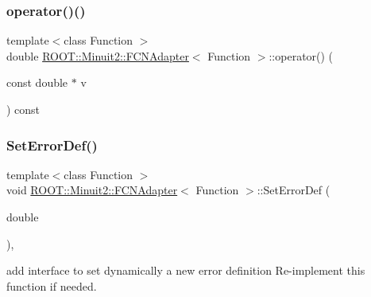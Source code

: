 \mbox{\label{classROOT_1_1Minuit2_1_1FCNAdapter_a9321402d626f4bdfbdbef3b63d452daf}} 
\subsubsection{\texorpdfstring{operator()()}{operator()()}\hspace{0.1cm}{\footnotesize\ttfamily [6/6]}}
{\footnotesize\ttfamily template$<$class Function $>$ \\
double \mbox{\hyperlink{classROOT_1_1Minuit2_1_1FCNAdapter}{R\+O\+O\+T\+::\+Minuit2\+::\+F\+C\+N\+Adapter}}$<$ Function $>$\+::operator() (\begin{DoxyParamCaption}\item[{const double $\ast$}]{v }\end{DoxyParamCaption}) const\hspace{0.3cm}{\ttfamily [inline]}}

\mbox{\label{classROOT_1_1Minuit2_1_1FCNAdapter_ad87419db3f1d4764497f52487fef6fc8}} 
\subsubsection{\texorpdfstring{SetErrorDef()}{SetErrorDef()}\hspace{0.1cm}{\footnotesize\ttfamily [1/3]}}
{\footnotesize\ttfamily template$<$class Function $>$ \\
void \mbox{\hyperlink{classROOT_1_1Minuit2_1_1FCNAdapter}{R\+O\+O\+T\+::\+Minuit2\+::\+F\+C\+N\+Adapter}}$<$ Function $>$\+::Set\+Error\+Def (\begin{DoxyParamCaption}\item[{double}]{ }\end{DoxyParamCaption})\hspace{0.3cm}{\ttfamily [inline]}, {\ttfamily [virtual]}}

add interface to set dynamically a new error definition Re-\/implement this function if needed. 

